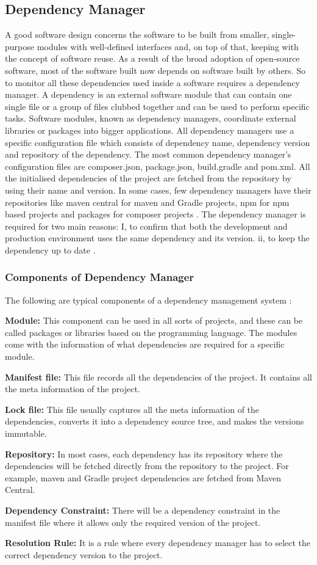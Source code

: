 \subsection{Dependency Manager}
A good software design concerns the software to be built from smaller, single-purpose modules with well-defined interfaces and, on top of that, keeping with the concept of software reuse. As a result of the broad adoption of open-source software, most of the software built now depends on software built by others. So to monitor all these dependencies used inside a software requires a dependency manager. A dependency is an external software module that can contain one single file or a group of files clubbed together and can be used to perform specific tasks. Software modules, known as dependency managers, coordinate external libraries or packages into bigger applications. All dependency managers use a specific configuration file which consists of dependency name, dependency version and repository of the dependency. The most common dependency manager’s configuration files are composer.json, package.json, build.gradle and pom.xml. All the initialised dependencies of the project are fetched from the repository by using their name and version. In some cases, few dependency managers have their repositories like maven central for maven and Gradle projects, npm for npm based projects and packages for composer projects \cite{Ma2017}. The dependency manager is required for two main reasons: I, to confirm that both the development and production environment uses the same dependency and its version. ii, to keep the dependency up to date \cite{Dm2018}.
%
\subsubsection{Components of Dependency Manager}
The following are typical components of a dependency management system \cite{DataWH}:

\textbf{Module:} This component can be used in all sorts of projects, and these can be called packages or libraries based on the programming language. The modules come with the information of what dependencies are required for a specific module.

\textbf{Manifest file:} This file records all the dependencies of the project. It contains all the meta information of the project. 

\textbf{Lock file:} This file usually captures all the meta information of the dependencies, converts it into a dependency source tree, and makes the versions immutable.

\textbf{Repository:} In most cases, each dependency has its repository where the dependencies will be fetched directly from the repository to the project. For example, maven and Gradle project dependencies are fetched from Maven Central. 

\textbf{Dependency Constraint:} There will be a dependency constraint in the manifest file where it allows only the required version of the project.

\textbf{Resolution Rule:} It is a rule where every dependency manager has to select the correct dependency version to the project.


%
